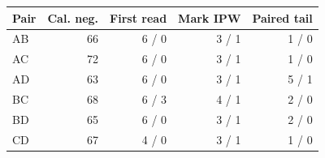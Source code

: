 \begin{tabular}{lrrrr}
\toprule
Pair & Cal. neg. & First read & Mark IPW & Paired tail \\
\midrule
AB & 66 & 6 / 0 & 3 / 1 & 1 / 0 \\
AC & 72 & 6 / 0 & 3 / 1 & 1 / 0 \\
AD & 63 & 6 / 0 & 3 / 1 & 5 / 1 \\
BC & 68 & 6 / 3 & 4 / 1 & 2 / 0 \\
BD & 65 & 6 / 0 & 3 / 1 & 2 / 0 \\
CD & 67 & 4 / 0 & 3 / 1 & 1 / 0 \\
\bottomrule
\end{tabular}
